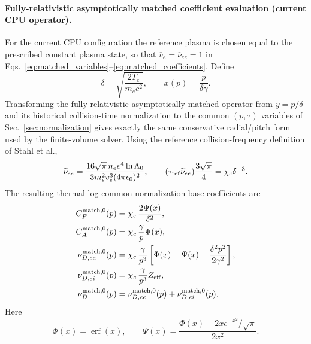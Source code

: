 \documentclass[11pt]{article}
\begin{document}
\paragraph{Fully-relativistic asymptotically matched coefficient evaluation (current CPU operator).}
For the current CPU configuration the reference plasma is chosen equal to the prescribed
constant plasma state, so that $\overline v_e=\overline\nu_{ee}=1$ in
Eqs.~\eqref{eq:matched_variables}--\eqref{eq:matched_coefficients}.  Define
\begin{equation}
 \delta=\sqrt{\frac{2T_e}{m_ec^2}},\qquad
 x(p)=\frac{p}{\delta\gamma}.
 \label{eq:matched_numeric_scalings}
\end{equation}
Transforming the fully-relativistic asymptotically matched operator from
$y=p/\delta$ and its historical collision-time normalization to the common $(p,\tau)$
variables of Sec.~\ref{sec:normalization} gives
exactly the same conservative radial/pitch form used by the finite-volume solver.  Using
the reference collision-frequency definition of Stahl et al.,
\begin{equation}
 \widetilde\nu_{ee}
 =\frac{16\sqrt{\pi}\,n_e e^4\ln\Lambda_0}
 {3m_e^2v_e^3(4\pi\epsilon_0)^2},
 \qquad
 (\tau_{\rm ref}\widetilde\nu_{ee})\frac{3\sqrt{\pi}}{4}
 =\chi_c\delta^{-3}.
 \label{eq:matched_numeric_frequency_conversion}
\end{equation}
The resulting thermal-log common-normalization base coefficients are
\begin{align}
 C_F^{\rm match,0}(p)
 &=\chi_c\,\frac{2\Psi(x)}{\delta^2},
 \label{eq:matched_numeric_cf}\\
 C_A^{\rm match,0}(p)
 &=\chi_c\,\frac{\gamma}{p}\Psi(x),
 \label{eq:matched_numeric_ca}\\
 \nu_{D,ee}^{\rm match,0}(p)
 &=\chi_c\,\frac{\gamma}{p^3}
 \left[
  \Phi(x)-\Psi(x)+\frac{\delta^2p^2}{2\gamma^2}
 \right],\\
 \nu_{D,ei}^{\rm match,0}(p)
 &=\chi_c\,\frac{\gamma}{p^3}Z_{\rm eff},\\
 \nu_D^{\rm match,0}(p)
 &=\nu_{D,ee}^{\rm match,0}(p)+\nu_{D,ei}^{\rm match,0}(p).
 \label{eq:matched_numeric_nud}
\end{align}
Here
\begin{equation}
 \Phi(x)=\operatorname{erf}(x),\qquad
 \Psi(x)=\frac{\Phi(x)-2x e^{-x^2}/\sqrt{\pi}}{2x^2}.
 \label{eq:matched_numeric_phi_psi}
\end{equation}
\end{document}
